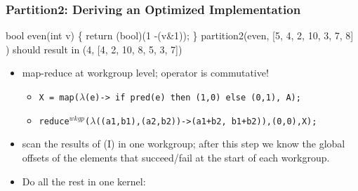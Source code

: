 \documentclass{beamer}
\begin{document}
\begin{frame}[fragile,t]
  \frametitle{Partition2: Deriving an Optimized Implementation}

\begin{colorcode}
bool even(int v) \{ return (bool)(1 -(v&1)); \}
partition2(even, [5, 4, 2, 10, 3, 7, 8] ) should result in
             (4, [4, 2, 10, 8, 5, 3, 7])
\end{colorcode}
\smallskip

\begin{scriptsize}
\begin{itemize}
    \item[(I)] map-reduce at workgroup level; operator is commutative!
        \begin{itemize}
           \item[(a)] \begin{scriptsize}{\tt X = map($\lambda$(e)-> if pred(e) then (1,0) else (0,1), A);}
                      \end{scriptsize}
           \item[(b)] \begin{scriptsize}{\tt reduce$^{wkgp}$($\lambda$((a1,b1),(a2,b2))->(a1+b2, b1+b2)),(0,0),X);}
                      \end{scriptsize}
        \end{itemize}\smallskip
    \item[(II)] scan the results of (I) in one workgroup; after this step we know 
                the global offsets of the elements that succeed/fail at the start
                of each workgroup.\smallskip
    \item[(III)] Do all the rest in one kernel:
        \begin{itemize}
\end{itemize}
\end{itemize}
\end{scriptsize}
\end{frame}
\end{document}
